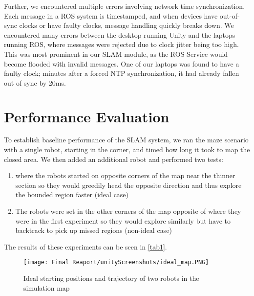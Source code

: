 \documentclass[11pt, conference]{IEEEtran}
\begin{document}
Further, we encountered multiple errors involving network time synchronization. Each message in a ROS system is timestamped, and when devices have out-of-sync clocks or have faulty clocks, message handling quickly breaks down. We encountered many errors between the desktop running Unity and the laptops running ROS, where messages were rejected due to clock jitter being too high. This was most prominent in our SLAM module, as the ROS Service would become flooded with invalid messages. One of our laptops was found to have a faulty clock; minutes after a forced NTP synchronization, it had already fallen out of sync by 20ms.


\section{Performance Evaluation}

To establish baseline performance of the SLAM system, we ran the maze scenario with a single robot, starting in the corner, and timed how long it took to map the closed area. We then added an additional robot and performed two tests: 
\begin{enumerate}
    \item where the robots started on opposite corners of the map near the thinner section so they would greedily head the opposite direction and thus explore the bounded region faster (ideal case)
    \item The robots were set in the other corners of the map opposite of where they were in the first experiment so they would explore similarly but have to backtrack to pick up missed regions (non-ideal case)
\end{enumerate}
The results of these experiments can be seen in \ref{tab1}.

\begin{figure}[ht]
\texttt{[image: Final Reaport/unityScreenshots/ideal\_map.PNG]}
\caption{Ideal starting positions and trajectory of two robots in the simulation map}
\label{fig:ideal_map}
\end{figure}
\end{document}
